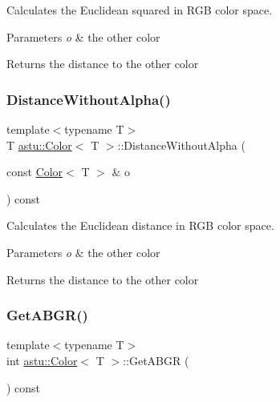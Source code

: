 Calculates the Euclidean squared in R\+GB color space.


\begin{DoxyParams}{Parameters}
{\em o} & the other color \\
\hline
\end{DoxyParams}
\begin{DoxyReturn}{Returns}
the distance to the other color 
\end{DoxyReturn}
\mbox{\label{classastu_1_1Color_a4802f8f0d0fcf65ba6853ac17c52b811}} 
\subsubsection{\texorpdfstring{Distance\+Without\+Alpha()}{DistanceWithoutAlpha()}}
{\footnotesize\ttfamily template$<$typename T$>$ \\
T \hyperlink{classastu_1_1Color}{astu\+::\+Color}$<$ T $>$\+::Distance\+Without\+Alpha (\begin{DoxyParamCaption}\item[{const \hyperlink{classastu_1_1Color}{Color}$<$ T $>$ \&}]{o }\end{DoxyParamCaption}) const\hspace{0.3cm}{\ttfamily [inline]}}

Calculates the Euclidean distance in R\+GB color space.


\begin{DoxyParams}{Parameters}
{\em o} & the other color \\
\hline
\end{DoxyParams}
\begin{DoxyReturn}{Returns}
the distance to the other color 
\end{DoxyReturn}
\mbox{\label{classastu_1_1Color_a11cf3e00ee1662cc67aae0fa5767df39}} 
\subsubsection{\texorpdfstring{Get\+A\+B\+G\+R()}{GetABGR()}}
{\footnotesize\ttfamily template$<$typename T$>$ \\
int \hyperlink{classastu_1_1Color}{astu\+::\+Color}$<$ T $>$\+::Get\+A\+B\+GR (\begin{DoxyParamCaption}{ }\end{DoxyParamCaption}) const\hspace{0.3cm}{\ttfamily [inline]}}

